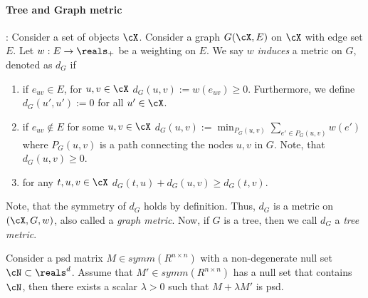 \paragraph{Tree and Graph metric}: Consider a set of objects $\cX$. Consider a graph $G(\cX,E)$ on $\cX$ with edge set $E$. Let $w: E \to \reals_{+}$ be a weighting on $E$. We say $w$ \textit{induces} a metric on $G$, denoted as $d_G$ if 
\begin{enumerate}
    \item if $e_{uv} \in E$, for $u,v \in \cX$ $d_G(u,v) := w(e_{uv}) \ge 0 $. Furthermore, we define $d_G(u',u') := 0$ for all $u' \in \cX$.
    \item if $e_{uv} \not\in E$ for some $u,v \in \cX$ $d_G(u,v) := \min_{P_G(u,v)} \sum_{e' \in P_G(u,v)} w(e')$ where $P_G(u,v)$ is a path connecting the nodes $u,v$ in $G$. Note, that $d_G(u,v) \ge 0$.
    \item for any $t,u,v \in \cX$ $d_G(t,u) + d_G(u,v) \ge d_G(t,v)$.
\end{enumerate}
Note, that the symmetry of $d_G$ holds by definition. Thus, $d_G$ is a metric on $(\cX,G,w)$, also called a \textit{graph metric}. Now, if $G$ is a tree, then we call $d_G$ a \textit{tree metric}. 

\begin{lemma}\label{lem: same nullset}
    Consider a psd matrix $M \in symm(R^{n\times n})$ with a non-degenerate null set $\cN \subset \reals^d$. Assume that $M' \in symm(R^{n\times n})$ has a null set that contains $\cN$, then there exists a scalar $\lambda > 0$ such that $M + \lambda M'$ is psd.
\end{lemma}

